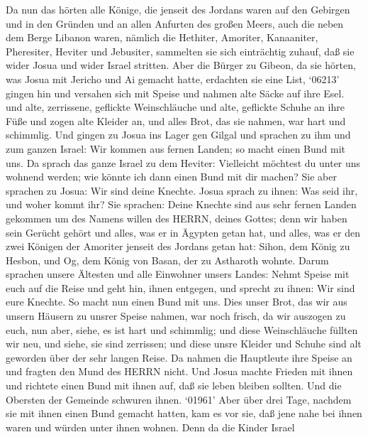  Da nun das hörten alle Könige, die jenseit des Jordans
waren auf den Gebirgen und in den Gründen und an allen Anfurten des
großen Meers, auch die neben dem Berge Libanon waren, nämlich die
Hethiter, Amoriter, Kanaaniter, Pheresiter, Heviter und Jebusiter,
 sammelten sie sich einträchtig zuhauf, daß sie wider Josua
und wider Israel stritten.  Aber die Bürger zu Gibeon, da
sie hörten, was Josua mit Jericho und Ai gemacht hatte, erdachten sie
eine List,  `06213' gingen hin und versahen sich mit Speise
und nahmen alte Säcke auf ihre Esel.  und alte, zerrissene,
geflickte Weinschläuche und alte, geflickte Schuhe an ihre Füße und
zogen alte Kleider an, und alles Brot, das sie nahmen, war hart und
schimmlig.  Und gingen zu Josua ins Lager gen Gilgal und
sprachen zu ihm und zum ganzen Israel: Wir kommen aus fernen Landen; so
macht einen Bund mit uns.  Da sprach das ganze Israel zu dem
Heviter: Vielleicht möchtest du unter uns wohnend werden; wie könnte ich
dann einen Bund mit dir machen?  Sie aber sprachen zu Josua:
Wir sind deine Knechte. Josua sprach zu ihnen: Was seid ihr, und woher
kommt ihr?  Sie sprachen: Deine Knechte sind aus sehr fernen
Landen gekommen um des Namens willen des HERRN, deines Gottes; denn wir
haben sein Gerücht gehört und alles, was er in Ägypten getan hat,
 und alles, was er den zwei Königen der Amoriter jenseit
des Jordans getan hat: Sihon, dem König zu Hesbon, und Og, dem König von
Basan, der zu Astharoth wohnte.  Darum sprachen unsere
Ältesten und alle Einwohner unsers Landes: Nehmt Speise mit euch auf die
Reise und geht hin, ihnen entgegen, und sprecht zu ihnen: Wir sind eure
Knechte. So macht nun einen Bund mit uns.  Dies unser Brot,
das wir aus unsern Häusern zu unsrer Speise nahmen, war noch frisch, da
wir auszogen zu euch, nun aber, siehe, es ist hart und schimmlig;
 und diese Weinschläuche füllten wir neu, und siehe, sie
sind zerrissen; und diese unsre Kleider und Schuhe sind alt geworden
über der sehr langen Reise.  Da nahmen die Hauptleute ihre
Speise an und fragten den Mund des HERRN nicht.  Und Josua
machte Frieden mit ihnen und richtete einen Bund mit ihnen auf, daß sie
leben bleiben sollten. Und die Obersten der Gemeinde schwuren ihnen.
 `01961' Aber über drei Tage, nachdem sie mit ihnen einen
Bund gemacht hatten, kam es vor sie, daß jene nahe bei ihnen waren und
würden unter ihnen wohnen.  Denn da die Kinder Israel
